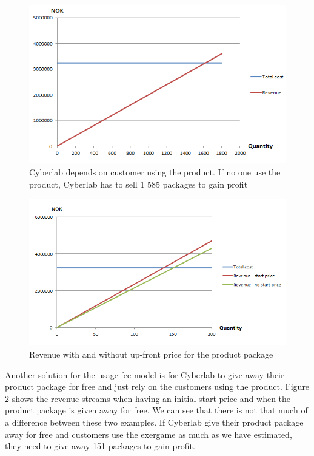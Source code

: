 \begin{figure}
\begin{center}
\includegraphics[scale=0.8]{revenuestreamusage}
\caption[Usage fee example - only sales]{Cyberlab depends on customer using the product. If no one use the product, Cyberlab has to sell 1 585 packages to gain profit}
\label{fig:RevenueStreamUsage}
\end{center}
\end{figure}
\begin{figure}
\begin{center}
\includegraphics[scale=0.8]{usagewithwithoutstartprice}
\caption[Usage fee example]{Revenue with and without up-front price for the product package}
\label{fig:UsageWithWithout}
\end{center}
\end{figure}
Another solution for the usage fee model is for Cyberlab to give away their product package for free and just rely on the customers using the product. Figure \ref{fig:UsageWithWithout} shows the revenue streams when having an initial start price and when the product package is given away for free. We can see that there is not that much of a difference between these two examples. If Cyberlab give their product package away for free and customers use the exergame as much as we have estimated, they need to give away 151 packages to gain profit. \\ \\


